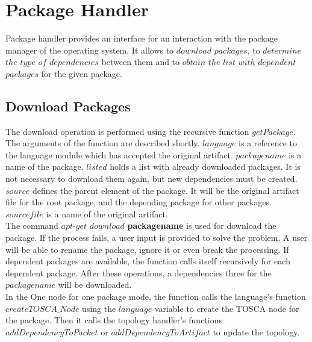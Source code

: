 \section{Package Handler}
Package handler provides an interface for an interaction with the package manager of the operating system.
It allows to $download$ $packages$, to $determine$ $the$ $type$ $of$ $dependencies$ between them and to $obtain$ $the$ $list$ $with$ $dependent$ $packages$ for the given package.

\subsection*{Download Packages}
The download operation is performed using the recursive function $getPackage$. 
The arguments of the function are described shortly.
$language$ is a reference to the language module which has accepted the original artifact.
$packagename$ is a name of the package.
$listed$ holds a list with already downloaded packages.
It is not necessary to download them again, but new dependencies must be created.
$source$ defines the parent element of the package. 
It will be the original artifact file for the root package, and the depending package for other packages.
$sourcefile$ is a name of the original artifact. \\
	The command $apt$-$get$ $download$ \textbf{packagename} is used for download the package. 
	If the process fails, a user input is provided to solve the problem. 
	A user will be able to rename the package, ignore it or even break the processing.
	If dependent packages are available, the function calls itself recursively for each dependent package.
	After these operations, a dependencies three for the $packagename$ will be downloaded.\\
In the One node for one package mode, the function calls the language's function $createTOSCA\_Node$ using the $language$ variable to create the TOSCA node for the package.
Then it calls the topology handler's functions $addDependencyToPacket$ or $addDependencyToArtifact$ to update the topology. 

